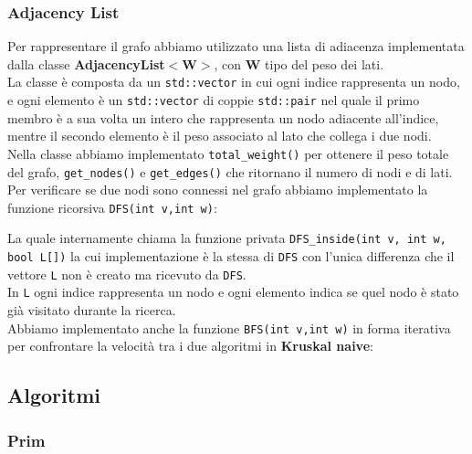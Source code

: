 \documentclass[]{article}
\begin{document}
\subsubsection{Adjacency List}
Per rappresentare il grafo abbiamo utilizzato una lista di adiacenza implementata dalla classe \textbf{AdjacencyList$<$W$>$}, con \textbf{W} tipo del peso dei lati.\\
La classe è composta da un \verb|std::vector| in cui ogni indice rappresenta un nodo, e ogni elemento è un \verb|std::vector| di coppie \verb|std::pair| nel quale il primo membro è a sua volta un intero che rappresenta un nodo adiacente all'indice, mentre il secondo elemento è il peso associato al lato che collega i due nodi.\\
Nella classe abbiamo implementato \verb|total_weight()| per ottenere il peso totale del grafo, \verb|get_nodes()| e \verb|get_edges()| che ritornano il numero di nodi e di lati.\\
Per verificare se due nodi sono connessi nel grafo abbiamo implementato la funzione ricorsiva \verb|DFS(int v,int w)|:
\lstset{language=c++, style=mystyle}

La quale internamente chiama la funzione privata \verb|DFS_inside(int v, int w, bool L[])| la cui implementazione è la stessa di \verb|DFS| con l'unica differenza che il vettore \verb|L| non è creato ma ricevuto da \verb|DFS|.\\
In \verb|L| ogni indice rappresenta un nodo e ogni elemento indica se quel nodo è stato già visitato durante la ricerca.\\
Abbiamo implementato anche la funzione \verb|BFS(int v,int w)| in forma iterativa per confrontare la velocità tra i due algoritmi in \textbf{Kruskal naive}:
\lstset{language=c++, style=mystyle}

\subsection{Algoritmi}
\subsubsection{Prim}
\newpage
\end{document}
